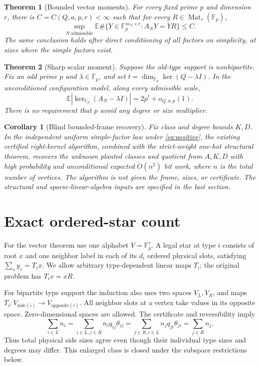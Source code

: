 \documentclass[11pt]{article}
\newtheorem{theorem}{Theorem}
\newtheorem{corollary}{Corollary}
\newcommand{\Fp}{\mathbb F_p}
\newcommand{\E}{\mathbb E}
\begin{document}
\begin{theorem}[Bounded vector moments]\label{thm:matrix}
For every fixed prime $p$ and dimension $r$, there is $C=C(Q,a,p,r)<\infty$ such that for every $R\in\operatorname{Mat}_r(\Fp)$,
\[
 \sup_{N\ \mathrm{admissible}}
 \E\#\{Y\in\Fp^{m_N\times r}:A_NY=YR\}\le C.
\]
The same conclusion holds after direct conditioning of all factors on simplicity, at sizes where the simple factors exist.
\end{theorem}

\begin{theorem}[Sharp scalar moment]\label{thm:scalar}
Suppose the old-type support is nonbipartite. Fix an odd prime $p$ and $\lambda\in\Fp$, and set $t=\dim_{\Fp}\ker(Q-\lambda I)$. In the unconditioned configuration model, along every admissible scale,
\[
 \E|\ker_{\Fp}(A_N-\lambda I)|=2p^t+o_{Q,a,p}(1).
\]
There is no requirement that $p$ avoid any degree or size multiplier.
\end{theorem}

\begin{corollary}[Blind bounded-frame recovery]\label{cor:blind}
Fix class and degree bounds $K,D$. In the independent uniform simple-factor law under \eqref{eq:positive}, the existing certified right-kernel algorithm, combined with the strict-weight one-hot structural theorem, recovers the unknown planted classes and quotient from $A,K,D$ with high probability and unconditional expected $\widetilde O(n^2)$ bit work, where $n$ is the total number of vertices. The algorithm is not given the frame, sizes, or certificate. The structural and sparse-linear-algebra inputs are specified in the last section.
\end{corollary}

\section{Exact ordered-star count}
For the vector theorem use one alphabet $V=\Fp^r$. A legal star at type $i$ consists of root $x$ and one neighbor label in each of its $d_i$ ordered physical slots, satisfying $\sum_s y_s=T_i x$. We allow arbitrary type-dependent linear maps $T_i$; the original problem has $T_i x=xR$.

For bipartite type support the induction also uses two spaces $V_L,V_R$, and maps $T_i:V_{\mathrm{side}(i)}\to V_{\mathrm{opposite}(i)}$. All neighbor slots at a vertex take values in its opposite space. Zero-dimensional spaces are allowed. The certificate and reversibility imply
\begin{equation}\label{eq:sides}
 \sum_{i\in L}n_i
 =\sum_{i\in L,j\in R}n_iq_{ij}\theta_{ij}
 =\sum_{j\in R,i\in L}n_jq_{ji}\theta_{ji}
 =\sum_{j\in R}n_j.
\end{equation}
Thus total physical side sizes agree even though their individual type sizes and degrees may differ. This enlarged class is closed under the subspace restrictions below.
\end{document}
